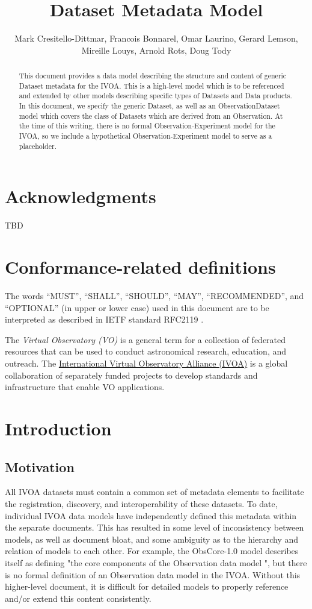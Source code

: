 \documentclass[11pt,a4paper]{ivoa}
\title{Dataset Metadata Model}
\author{Mark Cresitello-Dittmar, Francois Bonnarel, Omar Laurino, Gerard Lemson, Mireille Louys, Arnold Rots, Doug Tody}
\begin{document}
\begin{abstract}
  This document provides a data model describing the structure and content of
  generic Dataset metadata for the IVOA. This is a high-level model which is
  to be referenced and extended by other models describing specific types of
  Datasets and Data products. In this document, we specify the generic Dataset,
  as well as an ObservationDataset model which covers the class of Datasets
  which are derived from an Observation. At the time of this writing, there
  is no formal Observation-Experiment model for the IVOA, so we include a
  hypothetical Observation-Experiment model to serve as a placeholder.
\end{abstract}

\listoffigures

\section*{Acknowledgments}
TBD

\section*{Conformance-related definitions}
The words ``MUST'', ``SHALL'', ``SHOULD'', ``MAY'', ``RECOMMENDED'', and
``OPTIONAL'' (in upper or lower case) used in this document are to be
interpreted as described in IETF standard RFC2119 \citep{std:RFC2119}.

The \emph{Virtual Observatory (VO)} is a general term for a collection of
federated resources that can be used to conduct astronomical research, education, and outreach.
The \href{http://www.ivoa.net}{International Virtual Observatory Alliance (IVOA)}
is a global collaboration of separately funded projects to develop standards and
infrastructure that enable VO applications.



\section{Introduction}

\subsection{Motivation}
All IVOA datasets must contain a common set of metadata elements to facilitate
the registration, discovery, and interoperability of these datasets. To date,
individual IVOA data models have independently defined this metadata within
the separate documents. This has resulted in some level of inconsistency between
models, as well as document bloat, and some ambiguity as to the hierarchy and
relation of models to each other. For example, the ObsCore-1.0 model describes
itself as defining "the core components of the Observation data model ", but
there is no formal definition of an Observation data model in the IVOA. Without
this higher-level document, it is difficult for detailed models to properly
reference and/or extend this content consistently.
\end{document}

